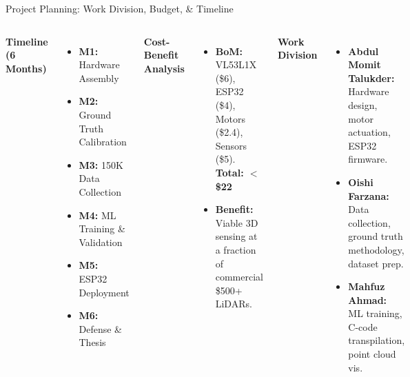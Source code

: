 \documentclass[aspectratio=169]{beamer}
\begin{document}
\begin{frame}{Project Planning: Work Division, Budget, \& Timeline}
    \vspace{0.1cm}
    \begin{columns}[t]
        \textbf{Timeline (6 Months)}
        \begin{itemize}
            \footnotesize
            \item \textbf{M1:} Hardware Assembly
            \item \textbf{M2:} Ground Truth Calibration
            \item \textbf{M3:} 150K Data Collection
            \item \textbf{M4:} ML Training \& Validation
            \item \textbf{M5:} ESP32 Deployment
            \item \textbf{M6:} Defense \& Thesis
        \end{itemize}
        
        \vspace{0.2cm}
        \textbf{Cost-Benefit Analysis}
        \begin{itemize}
            \footnotesize
            \item \textbf{BoM:} VL53L1X (\$6), ESP32 (\$4), Motors (\$2.4), Sensors (\$5). \textbf{Total: $<$ \$22}
            \item \textbf{Benefit:} Viable 3D sensing at a fraction of commercial \$500+ LiDARs.
        \end{itemize}
        
        \textbf{Work Division}
        \begin{itemize}
            \footnotesize
            \item \textbf{Abdul Momit Talukder:} Hardware design, motor actuation, ESP32 firmware.
            \item \textbf{Oishi Farzana:} Data collection, ground truth methodology, dataset prep.
            \item \textbf{Mahfuz Ahmad:} ML training, C-code transpilation, point cloud vis.
        \end{itemize}
    \end{columns}
\end{frame}
\end{document}
